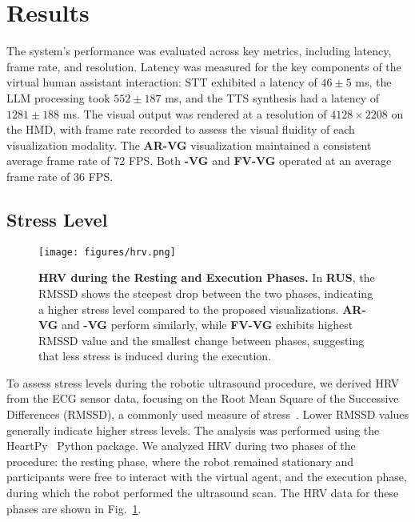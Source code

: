 \section{Results}\label{Sec:Results}

The system’s performance was evaluated across key metrics, including latency, frame rate, and resolution. Latency was measured for the key components of the virtual human assistant interaction: STT exhibited a latency of $46 \pm 5$ ms, the LLM processing took $552 \pm 187$ ms, and the TTS synthesis had a latency of $1281 \pm 188$ ms.
The visual output was rendered at a resolution of $4128 \times 2208$ on the HMD, with frame rate recorded to assess the visual fluidity of each visualization modality. The \textbf{AR-VG} visualization maintained a consistent average frame rate of 72 FPS. Both \textbf{-VG} and \textbf{FV-VG} operated at an average frame rate of 36 FPS.


\subsection{Stress Level}

\begin{figure}
    \centering
    \texttt{[image: figures/hrv.png]}
    \caption{\textbf{HRV during the Resting and Execution Phases.} In \textbf{RUS}, the RMSSD shows the steepest drop between the two phases, indicating a higher stress level compared to the proposed visualizations. \textbf{AR-VG} and \textbf{-VG} perform similarly, while \textbf{FV-VG} exhibits highest RMSSD value and the smallest change between phases, suggesting that less stress is induced during the execution.}
    \label{fig:hrv}
\end{figure}

To assess stress levels during the robotic ultrasound procedure, we derived HRV from the ECG sensor data, focusing on the Root Mean Square of the Successive Differences (RMSSD), a commonly used measure of stress~\cite{shaffer2017overview}. Lower RMSSD values generally indicate higher stress levels. The analysis was performed using the HeartPy~\cite{van2019heartpy} Python package.
We analyzed HRV during two phases of the procedure: the resting phase, where the robot remained stationary and participants were free to interact with the virtual agent, and the execution phase, during which the robot performed the ultrasound scan. The HRV data for these phases are shown in Fig.~\ref{fig:hrv}.

